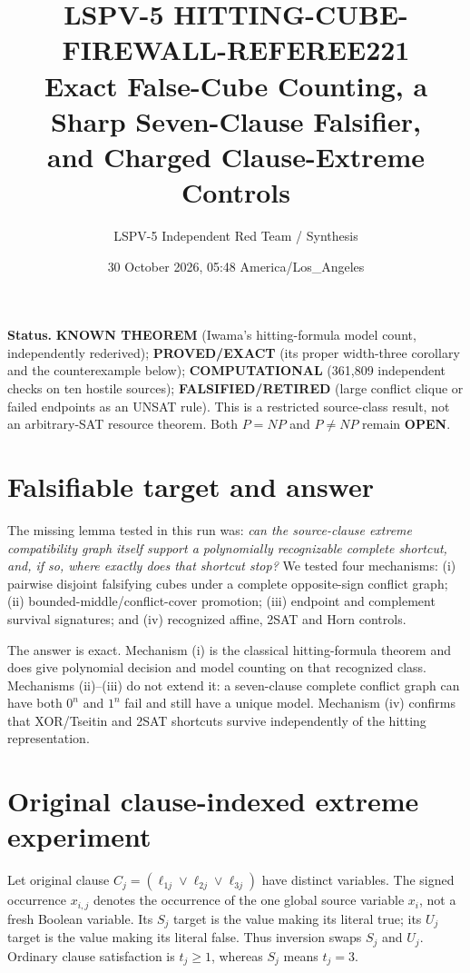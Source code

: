 \documentclass[11pt]{article}
\title{LSPV-5 HITTING-CUBE-FIREWALL-REFEREE221\\
Exact False-Cube Counting, a Sharp Seven-Clause Falsifier,\\
and Charged Clause-Extreme Controls}
\author{LSPV-5 Independent Red Team / Synthesis}
\date{30 October 2026, 05:48 America/Los\_Angeles}
\begin{document}
\maketitle

\noindent\textbf{Status.}
\textbf{KNOWN THEOREM} (Iwama's hitting-formula model count, independently
rederived); \textbf{PROVED/EXACT} (its proper width-three corollary and the
counterexample below); \textbf{COMPUTATIONAL} (361,809 independent checks on ten
hostile sources); \textbf{FALSIFIED/RETIRED} (large conflict clique or failed
endpoints as an UNSAT rule).  This is a restricted source-class result, not an
arbitrary-SAT resource theorem.  Both $P=NP$ and $P\ne NP$ remain \textbf{OPEN}.

\section{Falsifiable target and answer}
The missing lemma tested in this run was: \emph{can the source-clause extreme
compatibility graph itself support a polynomially recognizable complete shortcut,
and, if so, where exactly does that shortcut stop?}  We tested four mechanisms:
(i) pairwise disjoint falsifying cubes under a complete opposite-sign conflict
graph; (ii) bounded-middle/conflict-cover promotion; (iii) endpoint and complement
survival signatures; and (iv) recognized affine, 2SAT and Horn controls.

The answer is exact.  Mechanism (i) is the classical hitting-formula theorem and
does give polynomial decision and model counting on that recognized class.
Mechanisms (ii)--(iii) do not extend it: a seven-clause complete conflict graph can
have both $0^n$ and $1^n$ fail and still have a unique model.  Mechanism (iv)
confirms that XOR/Tseitin and 2SAT shortcuts survive independently of the hitting
representation.

\section{Original clause-indexed extreme experiment}
Let original clause $C_j=(\ell_{1j}\vee\ell_{2j}\vee\ell_{3j})$ have distinct
variables.  The signed occurrence $x_{i,j}$ denotes the occurrence of the one
global source variable $x_i$, not a fresh Boolean variable.  Its $S_j$ target is
the value making its literal true; its $U_j$ target is the value making its literal
false.  Thus inversion swaps $S_j$ and $U_j$.  Ordinary clause satisfaction is
$t_j\ge1$, whereas $S_j$ means $t_j=3$.
\end{document}
